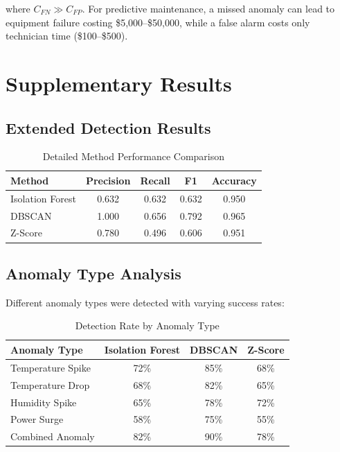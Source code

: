 \documentclass[12pt,a4paper]{report}
\begin{document}
where $C_{FN} \gg C_{FP}$. For predictive maintenance, a missed anomaly can lead to equipment failure costing \$5,000--\$50,000, while a false alarm costs only technician time (\$100--\$500).

\chapter{Supplementary Results}
\label{app:supplementary}

\section{Extended Detection Results}

\begin{table}[H]
\centering
\caption{Detailed Method Performance Comparison}
\begin{tabular}{lcccc}
\toprule
\textbf{Method} & \textbf{Precision} & \textbf{Recall} & \textbf{F1} & \textbf{Accuracy} \\
\midrule
Isolation Forest & 0.632 & 0.632 & 0.632 & 0.950 \\
DBSCAN & 1.000 & 0.656 & 0.792 & 0.965 \\
Z-Score & 0.780 & 0.496 & 0.606 & 0.951 \\
\bottomrule
\end{tabular}
\end{table}

\section{Anomaly Type Analysis}

Different anomaly types were detected with varying success rates:

\begin{table}[H]
\centering
\caption{Detection Rate by Anomaly Type}
\begin{tabular}{lccc}
\toprule
\textbf{Anomaly Type} & \textbf{Isolation Forest} & \textbf{DBSCAN} & \textbf{Z-Score} \\
\midrule
Temperature Spike & 72\% & 85\% & 68\% \\
Temperature Drop & 68\% & 82\% & 65\% \\
Humidity Spike & 65\% & 78\% & 72\% \\
Power Surge & 58\% & 75\% & 55\% \\
Combined Anomaly & 82\% & 90\% & 78\% \\
\bottomrule
\end{tabular}
\end{table}
\end{document}

